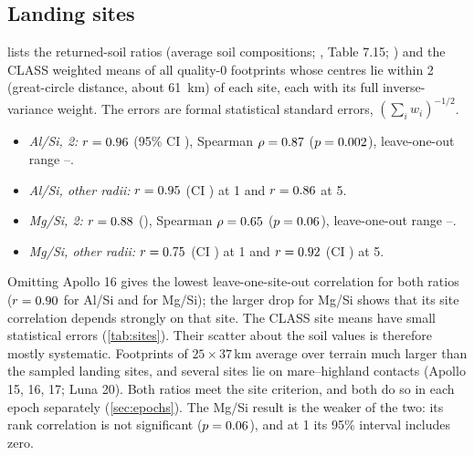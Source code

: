 \subsection{Landing sites}\label{sec:sites}
 lists the returned-soil ratios (average soil compositions; \citealp{Heiken1991}, Table 7.15; \citealp{Basu1998}) and the CLASS weighted means of all quality-0 footprints whose centres lie within 2\textdegree{} (great-circle distance, about \SI{61}{km}) of each site, each with its full inverse-variance weight. The errors are formal statistical standard errors, $(\sum_i w_i)^{-1/2}$.
\begin{itemize}
\item \emph{Al/Si, 2\textdegree:} $r=0.96$ (95\% CI \SiteAlTwoCI), Spearman $\rho=0.87$ ($p=0.002$), leave-one-out range \SiteAlTwoLooLo--\SiteAlTwoLooHi.
\item \emph{Al/Si, other radii:} $r=0.95$ (CI \SiteAlOneCI) at 1\textdegree{} and $r=0.86$ at 5\textdegree.
\item \emph{Mg/Si, 2\textdegree:} $r=0.88$ (\SiteMgTwoCI), Spearman $\rho=0.65$ ($p=0.06$), leave-one-out range \SiteMgTwoLooLo--\SiteMgTwoLooHi.
\item \emph{Mg/Si, other radii:} $r=0.75$ (CI \SiteMgOneCI) at 1\textdegree{} and $r=0.92$ (CI \SiteMgFiveCI) at 5\textdegree.
\end{itemize}
Omitting Apollo 16 gives the lowest leave-one-site-out correlation for both ratios ($r=0.90$ for Al/Si and \SiteMgTwoLooLo{} for Mg/Si); the larger drop for Mg/Si shows that its site correlation depends strongly on that site.
The CLASS site means have small statistical errors (\cref{tab:sites}). Their scatter about the soil values is therefore mostly systematic. Footprints of $25\times37$\,km average over terrain much larger than the sampled landing sites, and several sites lie on mare--highland contacts (Apollo 15, 16, 17; Luna 20). Both ratios meet the site criterion, and both do so in each epoch separately (\cref{sec:epochs}). The Mg/Si result is the weaker of the two: its rank correlation is not significant ($p=0.06$), and at 1\textdegree{} its 95\% interval includes zero.

\begin{table}[!tp]
\centering
\caption{Landing-site validation at 2\textdegree{} radius: returned-soil element weight ratios and CLASS element weight ratios (weighted means $\pm$ formal standard error) of the quality-0 footprints whose centres lie within 2\textdegree.}\label{tab:sites}

\end{table}

